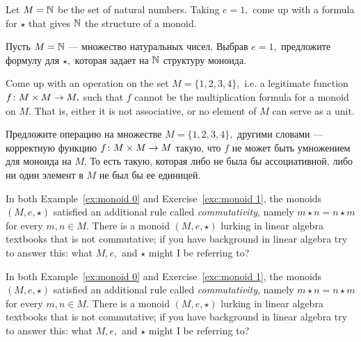 \documentclass[CT4S-EN-RU]{subfiles}
\begin{document}
\begin{exerciseENG}\label{exc:monoid 1}
Let $M={\mathbb N}$ be the set of natural numbers. Taking $e=1,$ come up with a formula for $\star$ that gives ${\mathbb N}$ the structure of a monoid.
\end{exerciseENG}

\begin{exerciseRUS}\label{exc:monoid 1}
Пусть $M={\mathbb N}$ — множество натуральных чисел. Выбрав $e=1,$ предложите формулу для $\star,$ которая задает на ${\mathbb N}$ структуру моноида.
\end{exerciseRUS}

\begin{exerciseENG}
Come up with an operation on the set $M=\{1,2,3,4\},$ i.e. a legitimate function $f\colon M\times M\rightarrow M,$ such that $f$ cannot be the multiplication formula for a monoid on $M.$ That is, either it is not associative, or no element of $M$ can serve as a unit.
\end{exerciseENG}

\begin{exerciseRUS}
Предложите операцию на множестве $M=\{1,2,3,4\},$ другими словами — корректную функцию $f\colon M\times M\rightarrow M$ такую, что $f$ не может быть умножением для моноида на $M.$ То есть такую, которая либо не была бы ассоциативной, либо ни один элемент в $M$ не был бы ее единицей.
\end{exerciseRUS}

\begin{exerciseENG}\label{ex:commutative monoid}
In both Example~\ref{ex:monoid 0} and Exercise~\ref{exc:monoid 1}, the monoids $(M,e,\star)$ satisfied an additional rule called {\em commutativity}, namely $m\star n=n\star m$ for every $m,n\in M.$ There is a monoid $(M,e,\star)$ lurking in linear algebra textbooks that is not commutative; if you have background in linear algebra try to answer this: what $M, e,$ and $\star$ might I be referring to?
\end{exerciseENG}

\begin{exerciseRUS}\label{ex:commutative monoid}
In both Example~\ref{ex:monoid 0} and Exercise~\ref{exc:monoid 1}, the monoids $(M,e,\star)$ satisfied an additional rule called {\em commutativity}, namely $m\star n=n\star m$ for every $m,n\in M.$ There is a monoid $(M,e,\star)$ lurking in linear algebra textbooks that is not commutative; if you have background in linear algebra try to answer this: what $M, e,$ and $\star$ might I be referring to?
\end{exerciseRUS}
\end{document}
